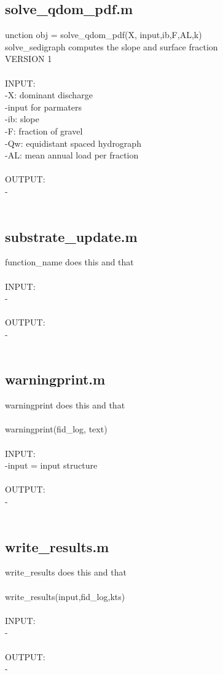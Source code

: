 \subsection{solve\_qdom\_pdf.m}
unction obj = solve\_qdom\_pdf(X, input,ib,F,AL,k) \\ 
solve\_sedigraph computes the slope and surface fraction  \\ 
 VERSION 1 \\ 
 \\ 
INPUT: \\ 
   -X: dominant discharge \\ 
   -input for parmaters \\ 
   -ib: slope \\ 
   -F: fraction of gravel  \\ 
   -Qw: equidistant spaced hydrograph \\ 
   -AL: mean annual load per fraction \\ 
 \\ 
OUTPUT: \\ 
   - \\ 
 \\ 
\subsection{substrate\_update.m}
function\_name does this and that \\ 
 \\ 
INPUT: \\ 
   - \\ 
 \\ 
OUTPUT: \\ 
   - \\ 
 \\ 
\subsection{warningprint.m}
warningprint does this and that \\ 
 \\ 
warningprint(fid\_log, text) \\ 
 \\ 
INPUT: \\ 
   -input = input structure \\ 
 \\ 
OUTPUT: \\ 
   - \\ 
 \\ 
\subsection{write\_results.m}
write\_results does this and that \\ 
 \\ 
write\_results(input,fid\_log,kts) \\ 
 \\ 
INPUT: \\ 
   - \\ 
 \\ 
OUTPUT: \\ 
   - \\ 
 \\ 
